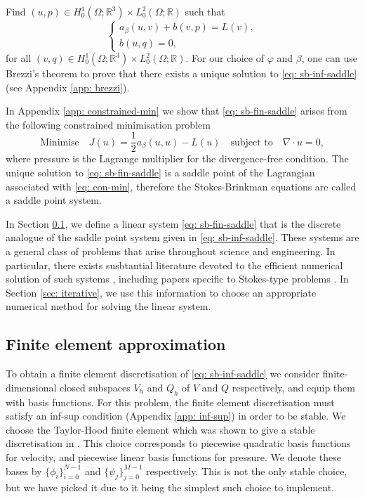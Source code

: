 \documentclass[12pt]{article}
\theoremstyle{theorem}
\begin{document}
Find $(u, p) \in H^1_0(\Omega; \mathbb{R}^3) \times L^2_0(\Omega; \mathbb{R})$ such that
\begin{equation}\label{eq: sb-inf-saddle}
    \begin{cases}
        a_\beta(u, v)+b(v,p) = L(v), \\
        b(u, q) = 0,
    \end{cases}
\end{equation}
for all $(v, q) \in H^1_0(\Omega; \mathbb{R}^3) \times L^2_0(\Omega; \mathbb{R})$.
For our choice of $\varphi$ and $\beta$, one can use Brezzi's theorem to prove that there exists a unique solution to \eqref{eq: sb-inf-saddle} (see Appendix \ref{app: brezzi}).

In Appendix \ref{app: constrained-min} we show that \eqref{eq: sb-fin-saddle} arises from the following constrained minimisation problem
\begin{equation}\label{eq: con-min}
    \text{Minimise} \quad J(u) = \frac{1}{2}a_\beta(u, u) - L(u) \quad \text{subject to} \quad \nabla \cdot u = 0,
\end{equation}
where pressure is the Lagrange multiplier for the divergence-free condition. The unique solution to \eqref{eq: sb-fin-saddle} is a saddle point of the Lagrangian associated with \eqref{eq: con-min}, therefore the Stokes-Brinkman equations are called a saddle point system.

In Section \ref{sec: fem}, we define a linear system \eqref{eq: sb-fin-saddle} that is the discrete analogue of the saddle point system given in \eqref{eq: sb-inf-saddle}. These systems are a general class of problems that arise throughout science and engineering. In particular, there exists susbtantial literature devoted to the efficient numerical solution of such systems \cite{benzi2005numerical,benzi2004preconditioner}, including papers specific to Stokes-type problems \cite{elman2002preconditioners,braess1997,larin2008}. In Section \ref{sec: iterative}, we use this information to choose an appropriate numerical method for solving the linear system.

\subsection{Finite element approximation}\label{sec: fem}

To obtain a finite element discretisation of \eqref{eq: sb-inf-saddle} we consider finite-dimensional closed subspaces $V_h$ and $Q_h$ of $V$ and $Q$ respectively, and equip them with basis functions. For this problem, the finite element discretisation must satisfy an inf-sup condition (Appendix \ref{app: inf-sup}) in order to be stable. We choose the Taylor-Hood finite element which was shown to give a stable discretisation in \cite{taylor1973}. This choice corresponds to piecewise quadratic basis functions for velocity, and piecewise linear basis functions for pressure. We denote these bases by $\{\phi_i\}_{i=0}^{N-1}$ and $\{\psi_j\}_{j=0}^{M-1}$ respectively. This is not the only stable choice, but we have picked it due to it being the simplest such choice to implement.
\end{document}
